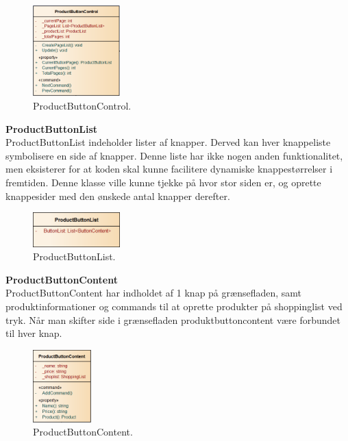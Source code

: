 \begin{figure}[H]
	\centering
	\includegraphics[width=0.3\textwidth]{Systemdesign/Frontend/pics/ProductButtonControl}
	\caption{ProductButtonControl.}
	\label{fig:PBC}
\end{figure}

\textbf{ProductButtonList} \\
ProductButtonList indeholder lister af knapper. Derved kan hver knappeliste symbolisere en side af knapper. Denne liste har ikke nogen anden funktionalitet, men eksisterer for at koden skal kunne facilitere dynamiske knappestørrelser i fremtiden. Denne klasse ville kunne tjekke på hvor stor siden er, og oprette knappesider med den ønskede antal knapper derefter.


\begin{figure}[H]
	\centering
	\includegraphics[width=0.3\textwidth]{Systemdesign/Frontend/pics/ProductButtonList}
	\caption{ProductButtonList.}
	\label{fig:PBL}
\end{figure}

\textbf{ProductButtonContent} \\
ProductButtonContent har indholdet af 1 knap på grænsefladen, samt produktinformationer og commands til at oprette produkter på shoppinglist ved tryk. Når man skifter side i grænsefladen produktbuttoncontent være forbundet til hver knap.

\begin{figure}[H]
	\centering
	\includegraphics[width=0.2\textwidth]{Systemdesign/Frontend/pics/ProductButtonContent}
	\caption{ProductButtonContent.}
	\label{fig:PBCon}
\end{figure}